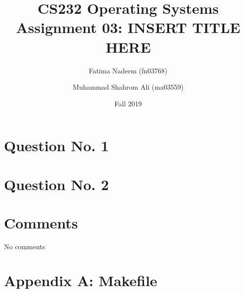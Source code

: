 \documentclass[a4paper]{article}
\begin{document}
\title{CS232 Operating Systems \\ Assignment 03: INSERT TITLE HERE}
\author{ Fatima Nadeem (fn03768) \and Muhammad Shahrom Ali (ma03559)}
\date{Fall 2019}
\maketitle


\section {Question No. 1}



\newpage

\section {Question No. 2}



\section {Comments}

No comments 

\newpage

\section{Appendix A: Makefile}


\end{document}

